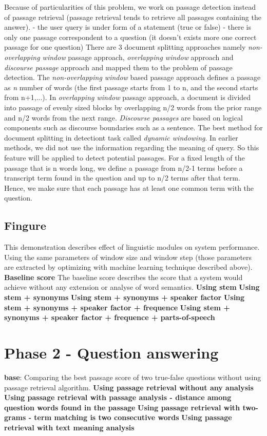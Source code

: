 \documentclass[12pt, a4paper]{report}
\begin{document}
Because of particularities of this problem, we work on passage detection instead of passage retrieval (passage retrieval tends to retrieve all passages containing the answer).
	- the user query is under form of a statement (true or false)
	- there is only one passage correspondent to a question (it doesn't exists more one correct passage for one question)
There are 3 document splitting approaches namely \textit{non-overlapping window} passage approach, \textit{overlapping window} approach and \textit{discourse passage} approach and mapped them to the problem of passage detection.
The \textit{non-overlapping window} based passage approach defines a passage as \textit{n} number of words (the first passage starts from 1 to n, and the second starts from n+1,...). In \textit{overlapping window} passage approach, a document is divided into passage of evenly sized blocks by overlapping n/2 words from the prior range and n/2 words from the next range. \textit{Discourse passages} are based on logical components such as discourse boundaries such as a sentence.
The best method for document splitting in detectiont task called \textit{dynamic windowing}. In earlier methods, we did not use the information regarding the meaning of query. So this feature will be applied to detect potential passages. For a fixed length of the passage that is n words long, we define a passage from n/2-1 terms before a transcript term found in the question and up to n/2 terms after that term. Hence, we make sure that each passage has at least one common term with the question.
\subsection{Fingure}
This demonstration describes effect of linguistic modules on system performance. 
Using the same parameters of window size and window step (those parameters are extracted by optimizing with machine learning technique described above).
\textbf{Baseline score} The baseline score describes the score that a system would achieve without any extension or analyse of word semantics. 
\textbf{Using stem}
\textbf{Using stem + synonyms}
\textbf{Using stem + synonyms + speaker factor}
\textbf{Using stem + synonyms + speaker factor + frequence}
\textbf{Using stem + synonyms + speaker factor + frequence + parts-of-speech}

\section{Phase 2 - Question answering}
\textbf{base}: Comparing the best passage score of two true-false questions without using passage retrieval algorithm.
\textbf{Using passage retrieval without any analysis}
\textbf{Using passage retrieval with passage analysis - distance among question words found in the passage} 
\textbf{Using passage retrieval with two-grams - term matching is two consecutive words}
\textbf{Using passage retrieval with text meaning analysis}
\end{document}
